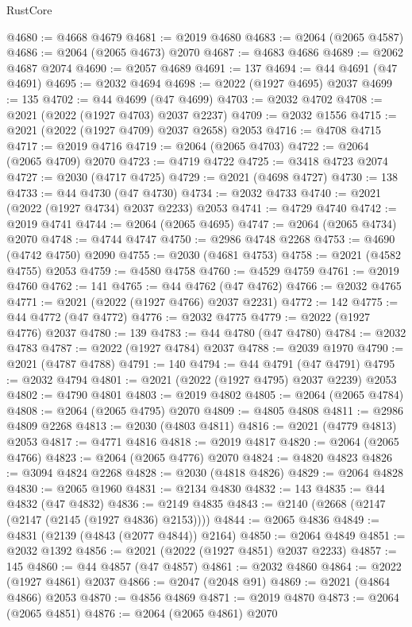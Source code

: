 \begin{lexlean}{RustCore}
\begin{coremodule}
@4680 := @4668 @4679
@4681 := @2019 @4680
@4683 := @2064 (@2065 @4587)
@4686 := @2064 (@2065 @4673) @2070
@4687 := @4683 @4686
@4689 := @2062 @4687 @2074
@4690 := @2057 @4689
@4691 := 137
@4694 := @44 @4691 (@47 @4691)
@4695 := @2032 @4694
@4698 := @2022 (@1927 @4695) @2037
@4699 := 135
@4702 := @44 @4699 (@47 @4699)
@4703 := @2032 @4702
@4708 := @2021 (@2022 (@1927 @4703) @2037 @2237)
@4709 := @2032 @1556
@4715 := @2021 (@2022 (@1927 @4709) @2037 @2658) @2053
@4716 := @4708 @4715
@4717 := @2019 @4716
@4719 := @2064 (@2065 @4703)
@4722 := @2064 (@2065 @4709) @2070
@4723 := @4719 @4722
@4725 := @3418 @4723 @2074
@4727 := @2030 (@4717 @4725)
@4729 := @2021 (@4698 @4727)
@4730 := 138
@4733 := @44 @4730 (@47 @4730)
@4734 := @2032 @4733
@4740 := @2021 (@2022 (@1927 @4734) @2037 @2233) @2053
@4741 := @4729 @4740
@4742 := @2019 @4741
@4744 := @2064 (@2065 @4695)
@4747 := @2064 (@2065 @4734) @2070
@4748 := @4744 @4747
@4750 := @2986 @4748 @2268
@4753 := @4690 (@4742 @4750) @2090
@4755 := @2030 (@4681 @4753)
@4758 := @2021 (@4582 @4755) @2053
@4759 := @4580 @4758
@4760 := @4529 @4759
@4761 := @2019 @4760
@4762 := 141
@4765 := @44 @4762 (@47 @4762)
@4766 := @2032 @4765
@4771 := @2021 (@2022 (@1927 @4766) @2037 @2231)
@4772 := 142
@4775 := @44 @4772 (@47 @4772)
@4776 := @2032 @4775
@4779 := @2022 (@1927 @4776) @2037
@4780 := 139
@4783 := @44 @4780 (@47 @4780)
@4784 := @2032 @4783
@4787 := @2022 (@1927 @4784) @2037
@4788 := @2039 @1970
@4790 := @2021 (@4787 @4788)
@4791 := 140
@4794 := @44 @4791 (@47 @4791)
@4795 := @2032 @4794
@4801 := @2021 (@2022 (@1927 @4795) @2037 @2239) @2053
@4802 := @4790 @4801
@4803 := @2019 @4802
@4805 := @2064 (@2065 @4784)
@4808 := @2064 (@2065 @4795) @2070
@4809 := @4805 @4808
@4811 := @2986 @4809 @2268
@4813 := @2030 (@4803 @4811)
@4816 := @2021 (@4779 @4813) @2053
@4817 := @4771 @4816
@4818 := @2019 @4817
@4820 := @2064 (@2065 @4766)
@4823 := @2064 (@2065 @4776) @2070
@4824 := @4820 @4823
@4826 := @3094 @4824 @2268
@4828 := @2030 (@4818 @4826)
@4829 := @2064 @4828
@4830 := @2065 @1960
@4831 := @2134 @4830
@4832 := 143
@4835 := @44 @4832 (@47 @4832)
@4836 := @2149 @4835
@4843 := @2140 (@2668 (@2147 (@2147 (@2145 (@1927 @4836) @2153))))
@4844 := @2065 @4836
@4849 := @4831 (@2139 (@4843 (@2077 @4844)) @2164)
@4850 := @2064 @4849
@4851 := @2032 @1392
@4856 := @2021 (@2022 (@1927 @4851) @2037 @2233)
@4857 := 145
@4860 := @44 @4857 (@47 @4857)
@4861 := @2032 @4860
@4864 := @2022 (@1927 @4861) @2037
@4866 := @2047 (@2048 @91)
@4869 := @2021 (@4864 @4866) @2053
@4870 := @4856 @4869
@4871 := @2019 @4870
@4873 := @2064 (@2065 @4851)
@4876 := @2064 (@2065 @4861) @2070

\end{coremodule}
\end{lexlean}
